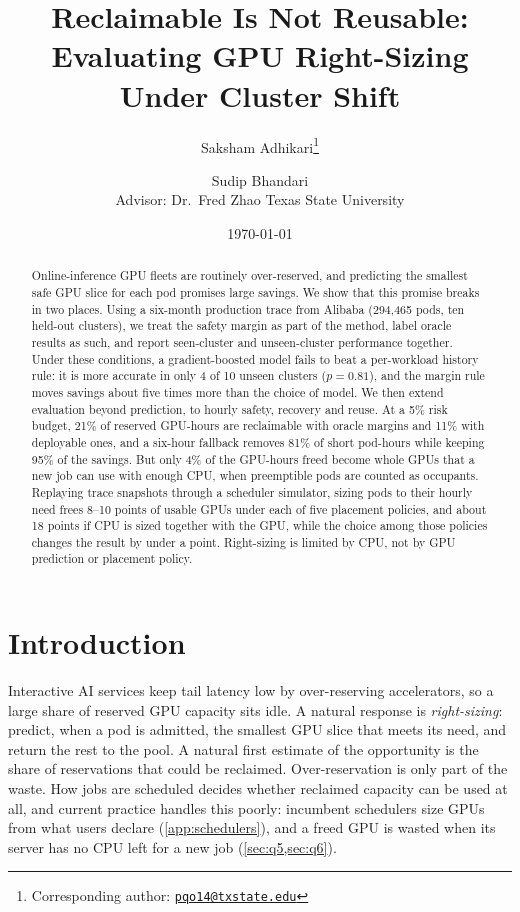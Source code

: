 \documentclass[10pt]{article}
\title{\textbf{Reclaimable Is Not Reusable:\\Evaluating GPU Right-Sizing Under Cluster Shift}}
\author{Saksham Adhikari\thanks{Corresponding author: \href{mailto:pqo14@txstate.edu}{\texttt{pqo14@txstate.edu}}} \and Sudip Bhandari\\[4pt]
\normalsize Advisor: Dr.\ Fred Zhao \textbullet{} Texas State University}
\date{\normalsize \today}
\begin{document}
\maketitle

\begin{abstract}
\noindent Online-inference GPU fleets are routinely over-reserved, and predicting the smallest safe GPU slice for each pod promises large savings. We show that this promise breaks in two places. Using a six-month production trace from Alibaba (294{,}465 pods, ten held-out clusters), we treat the safety margin as part of the method, label oracle results as such, and report seen-cluster and unseen-cluster performance together. Under these conditions, a gradient-boosted model fails to beat a per-workload history rule: it is more accurate in only 4 of 10 unseen clusters ($p = 0.81$), and the margin rule moves savings about five times more than the choice of model. We then extend evaluation beyond prediction, to hourly safety, recovery and reuse. At a 5\% risk budget, 21\% of reserved GPU-hours are reclaimable with oracle margins and 11\% with deployable ones, and a six-hour fallback removes 81\% of short pod-hours while keeping 95\% of the savings. But only 4\% of the GPU-hours freed become whole GPUs that a new job can use with enough CPU, when preemptible pods are counted as occupants. Replaying trace snapshots through a scheduler simulator, sizing pods to their hourly need frees 8--10 points of usable GPUs under each of five placement policies, and about 18 points if CPU is sized together with the GPU, while the choice among those policies changes the result by under a point. Right-sizing is limited by CPU, not by GPU prediction or placement policy.
\end{abstract}

\section{Introduction}
\label{sec:intro}

Interactive AI services keep tail latency low by over-reserving accelerators, so a large share of reserved GPU capacity sits idle. A natural response is \emph{right-sizing}: predict, when a pod is admitted, the smallest GPU slice that meets its need, and return the rest to the pool. A natural first estimate of the opportunity is the share of reservations that could be reclaimed. Over-reservation is only part of the waste. How jobs are scheduled decides whether reclaimed capacity can be used at all, and current practice handles this poorly: incumbent schedulers size GPUs from what users declare (\cref{app:schedulers}), and a freed GPU is wasted when its server has no CPU left for a new job (\cref{sec:q5,sec:q6}).
\end{document}
